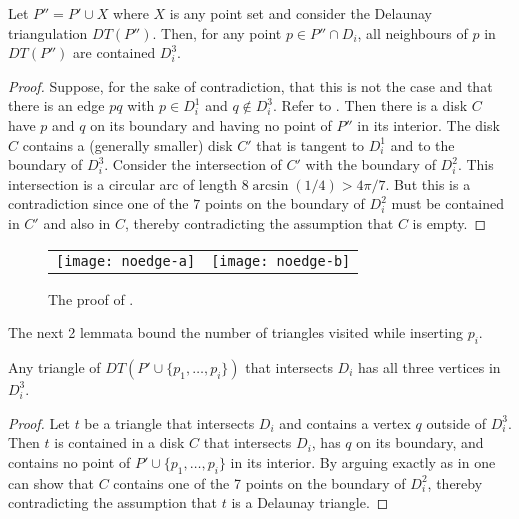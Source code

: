 \documentclass[lotsofwhite]{patmorin}
\begin{document}
\begin{lem}
Let $P''=P'\cup X$ where $X$ is any point set and consider the
Delaunay triangulation $DT(P'')$.  Then, for any point $p\in P''\cap
D_i$, all neighbours of $p$ in $DT(P'')$ are contained $D_i^3$.
\end{lem}

\begin{proof}
Suppose, for the sake of contradiction, that this is not the case and
that there is an edge $pq$ with $p\in D_i^1$ and $q\not\in D_i^3$.
Refer to .  Then there is a disk $C$ have $p$ and $q$
on its boundary and having no point of $P''$ in its interior.  The
disk $C$ contains a (generally smaller) disk $C'$ that is tangent to
$D_i^1$ and to the boundary of $D_i^3$.  Consider the intersection of
$C'$ with the boundary of $D_i^2$.  This intersection is a circular
arc of length $8\arcsin(1/4) > 4\pi/7$.  But this is a contradiction
since one of the $7$ points on the boundary of $D_i^2$ must be
contained in $C'$ and also in $C$, thereby contradicting the
assumption that $C$ is empty.
\end{proof}

\begin{figure}
  \begin{center}
    \begin{tabular}{cc}
      \texttt{[image: noedge-a]} & \texttt{[image: noedge-b]}
    \end{tabular}
  \end{center}
  \caption{The proof of .}
\end{figure}

The next 2 lemmata bound the number of triangles visited while
inserting $p_i$.

\begin{lem}
Any triangle of $DT(P'\cup\{p_1,\ldots,p_i\})$ that intersects $D_i$
has all three vertices in $D_i^3$.
\end{lem}

\begin{proof}
Let $t$ be a triangle that intersects $D_i$ and contains a vertex
$q$ outside of $D_i^3$.  Then $t$ is contained in a disk $C$ that
intersects $D_i$, has $q$ on its boundary, and contains no point of
$P'\cup\{p_1,\ldots,p_i\}$ in its interior.  By arguing
exactly as in  one can show that $C$ contains one of
the 7 points on the boundary of $D_i^2$, thereby contradicting the
assumption that $t$ is a Delaunay triangle.
\end{proof}
\end{document}
